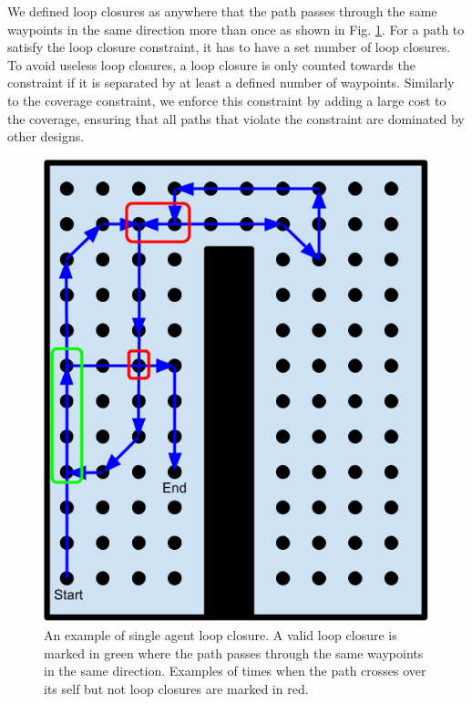 \documentclass[letterpaper, 10 pt, conference]{ieeeconf}  %
\begin{document}
We defined loop closures as anywhere that the path passes through the same waypoints in the same direction more than once as shown in Fig. \ref{fig:loop_closure}. For a path to satisfy the loop closure constraint, it has to have a set number of loop closures. To avoid useless loop closures, a loop closure is only counted towards the constraint if it is separated by at least a defined number of waypoints. Similarly to the coverage constraint, we enforce this constraint by adding a large cost to the coverage, ensuring that all paths that violate the constraint are dominated by other designs.

\begin{figure}
\centering
\includegraphics[width=1.0\linewidth]{loop_closure.png}
\caption[An example of single agent loop closure in coverage planner.]{An example of single agent loop closure. A valid loop closure is marked in green where the path passes through the same waypoints in the same direction. Examples of times when the path crosses over its self but not loop closures are marked in red.}
\label{fig:loop_closure}
\end{figure}
\end{document}
